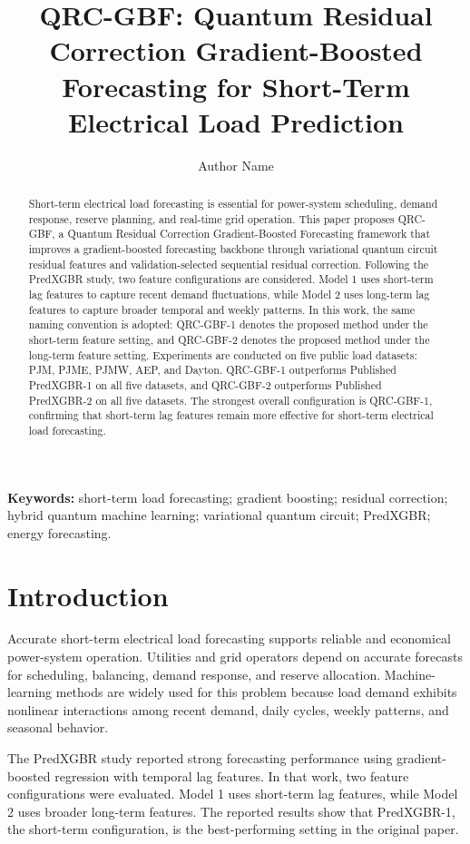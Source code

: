 \documentclass[11pt]{article}
\title{QRC-GBF: Quantum Residual Correction Gradient-Boosted Forecasting for Short-Term Electrical Load Prediction}
\author{Author Name}
\date{}
\begin{document}
\maketitle

\begin{abstract}
Short-term electrical load forecasting is essential for power-system scheduling, demand response, reserve planning, and real-time grid operation. This paper proposes QRC-GBF, a Quantum Residual Correction Gradient-Boosted Forecasting framework that improves a gradient-boosted forecasting backbone through variational quantum circuit residual features and validation-selected sequential residual correction. Following the PredXGBR study, two feature configurations are considered. Model 1 uses short-term lag features to capture recent demand fluctuations, while Model 2 uses long-term lag features to capture broader temporal and weekly patterns. In this work, the same naming convention is adopted: QRC-GBF-1 denotes the proposed method under the short-term feature setting, and QRC-GBF-2 denotes the proposed method under the long-term feature setting. Experiments are conducted on five public load datasets: PJM, PJME, PJMW, AEP, and Dayton. QRC-GBF-1 outperforms Published PredXGBR-1 on all five datasets, and QRC-GBF-2 outperforms Published PredXGBR-2 on all five datasets. The strongest overall configuration is QRC-GBF-1, confirming that short-term lag features remain more effective for short-term electrical load forecasting.
\end{abstract}

\textbf{Keywords:} short-term load forecasting; gradient boosting; residual correction; hybrid quantum machine learning; variational quantum circuit; PredXGBR; energy forecasting.

\section{Introduction}
Accurate short-term electrical load forecasting supports reliable and economical power-system operation. Utilities and grid operators depend on accurate forecasts for scheduling, balancing, demand response, and reserve allocation. Machine-learning methods are widely used for this problem because load demand exhibits nonlinear interactions among recent demand, daily cycles, weekly patterns, and seasonal behavior.

The PredXGBR study reported strong forecasting performance using gradient-boosted regression with temporal lag features. In that work, two feature configurations were evaluated. Model 1 uses short-term lag features, while Model 2 uses broader long-term features. The reported results show that PredXGBR-1, the short-term configuration, is the best-performing setting in the original paper.
\end{document}

